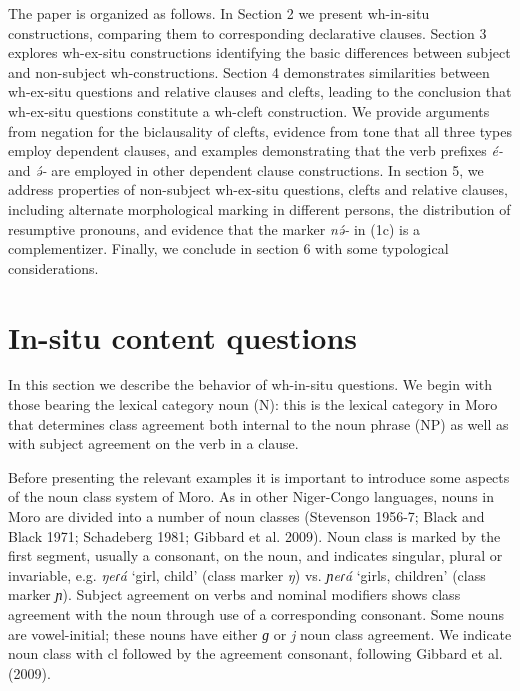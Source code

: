The paper is organized as follows. In Section 2 we present wh-in-situ constructions, comparing them to corresponding declarative clauses. Section 3 explores wh-ex-situ constructions identifying the basic differences between subject and non-subject wh-constructions. Section 4 demonstrates similarities between wh-ex-situ questions and relative clauses and clefts, leading to the conclusion that wh-ex-situ questions constitute a wh-cleft construction. We provide arguments from negation for the biclausality of clefts, evidence from tone that all three types employ dependent clauses, and examples demonstrating that the verb prefixes \textit{é-} and \textit{ə́-} are employed in other dependent clause constructions. In section 5, we address properties of non-subject wh-ex-situ questions, clefts and relative clauses, including alternate morphological marking in different persons, the distribution of resumptive pronouns, and evidence that the marker \textit{nə́-} in (1c) is a complementizer. Finally, we conclude in section 6 with some typological considerations. 

\section{In-situ content questions}\label{sec:ch18:insitu}

In this section we describe the behavior of wh-in-situ questions. We begin with those bearing the lexical category noun (N): this is the lexical category in Moro that determines class agreement both internal to the noun phrase (NP) as well as with subject agreement on the verb in a clause.  

Before presenting the relevant examples it is important to introduce some aspects of the noun class system of Moro. As in other Niger-Congo languages, nouns in Moro are divided into a number of noun classes (Stevenson 1956-7; Black and Black 1971; Schadeberg 1981; Gibbard et al. 2009). Noun class is marked by the first segment, usually a consonant, on the noun, and indicates singular, plural or invariable, e.g. \textit{ŋeɾá} ‘girl, child’ (class marker \textit{ŋ}) vs. \textit{ɲeɾá} ‘girls, children’ (class marker \textit{ɲ}). Subject agreement on verbs and nominal modifiers shows class agreement with the noun through use of a corresponding consonant. Some nouns are vowel-initial; these nouns have either \textit{ɡ} or \textit{j} noun class agreement. We indicate noun class with cl followed by the agreement consonant, following Gibbard et al. (2009). 

